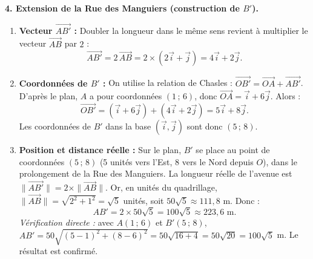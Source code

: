 \documentclass[11pt]{article}
\begin{document}
\begin{exoresolu}
\textbf{4. Extension de la Rue des Manguiers (construction de $B'$).}
\begin{enumerate}
    \item \textbf{Vecteur $\overrightarrow{AB'}$ :} Doubler la longueur dans le même sens revient à multiplier le vecteur $\overrightarrow{AB}$ par $2$ :
    \[
    \overrightarrow{AB'} = 2\,\overrightarrow{AB} = 2 \times (2\vec{i} + \vec{j}) = 4\vec{i} + 2\vec{j}.
    \]
    \item \textbf{Coordonnées de $B'$ :} On utilise la relation de Chasles : $\overrightarrow{OB'} = \overrightarrow{OA} + \overrightarrow{AB'}$.
    D'après le plan, $A$ a pour coordonnées $(1\,;\,6)$, donc $\overrightarrow{OA} = \vec{i} + 6\vec{j}$. Alors :
    \[
    \overrightarrow{OB'} = (\vec{i} + 6\vec{j}) + (4\vec{i} + 2\vec{j}) = 5\vec{i} + 8\vec{j}.
    \]
    Les coordonnées de $B'$ dans la base $(\vec{i}, \vec{j})$ sont donc \textbf{$(5\,;\,8)$}.
    \item \textbf{Position et distance réelle :}
    Sur le plan, $B'$ se place au point de coordonnées $(5\,;\,8)$ (5 unités vers l'Est, 8 vers le Nord depuis $O$), dans le prolongement de la Rue des Manguiers.
    La longueur réelle de l'avenue est $\|\overrightarrow{AB'}\| = 2 \times \|\overrightarrow{AB}\|$. Or, en unités du quadrillage, $\|\overrightarrow{AB}\| = \sqrt{2^2 + 1^2} = \sqrt{5}$ unités, soit $50\sqrt{5} \approx 111,8$ m. Donc :
    \[
    AB' = 2 \times 50\sqrt{5} = 100\sqrt{5} \approx 223,6 \text{ m}.
    \]
    \emph{Vérification directe :} avec $A(1\,;\,6)$ et $B'(5\,;\,8)$, $AB' = 50\sqrt{(5-1)^2 + (8-6)^2} = 50\sqrt{16+4} = 50\sqrt{20} = 100\sqrt{5}$ m. Le résultat est confirmé.
\end{enumerate}


\end{exoresolu}
\end{document}
